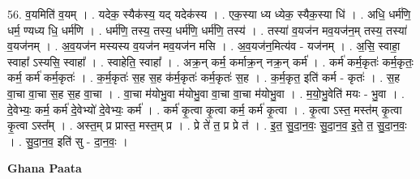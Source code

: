 \documentclass[17pt]{extarticle}
\begin{document}
56. व॒यमिति॑ व॒यम् । . यदेक॒ स्यैक॑स्य॒ यद् यदेक॑स्य । . एक॒स्या ध्य ध्येक॒ स्यैक॒स्या धि॑ । . अधि॒ धर्म॑णि॒ धर्म॒ ण्यध्य धि॒ धर्म॑णि । . धर्म॑णि॒ तस्य॒ तस्य॒ धर्म॑णि॒ धर्म॑णि॒ तस्य॑ । . तस्या॑ व॒यज॑न मव॒यज॑न॒म् तस्य॒ तस्या॑ व॒यज॑नम् । . अ॒व॒यज॑न मस्यस्य व॒यज॑न मव॒यज॑न मसि । . अ॒व॒यज॑न॒मित्य॑व - यज॑नम् । . अ॒सि॒ स्वाहा॒ स्वाहा᳚ ऽस्यसि॒ स्वाहा᳚ । . स्वाहेति॒ स्वाहा᳚ । . अक्र॒न् कर्म॒ कर्माक्र॒न् नक्र॒न् कर्म॑ । . कर्म॑ कर्म॒कृतः॑ कर्म॒कृतः॒ कर्म॒ कर्म॑ कर्म॒कृतः॑ । . क॒र्म॒कृतः॑ स॒ह स॒ह क॑र्म॒कृतः॑ कर्म॒कृतः॑ स॒ह । . क॒र्म॒कृत॒ इति॑ कर्म - कृतः॑ । . स॒ह वा॒चा वा॒चा स॒ह स॒ह वा॒चा । . वा॒चा म॑योभु॒वा म॑योभु॒वा वा॒चा वा॒चा म॑योभु॒वा । . म॒यो॒भु॒वेति॑ मयः - भु॒वा । . दे॒वेभ्यः॒ कर्म॒ कर्म॑ दे॒वेभ्यो॑ दे॒वेभ्यः॒ कर्म॑ । . कर्म॑ कृ॒त्वा कृ॒त्वा कर्म॒ कर्म॑ कृ॒त्वा । . कृ॒त्वा ऽस्त॒ मस्त॑म् कृ॒त्वा कृ॒त्वा ऽस्त᳚म् । . अस्त॒म् प्र प्रास्त॒ मस्त॒म् प्र । . प्रे ते॑ त॒ प्र प्रे त॑ । . इ॒त॒ सु॒दा॒न॒वः॒ सु॒दा॒न॒व॒ इ॒ते॒ त॒ सु॒दा॒न॒वः॒ । . सु॒दा॒न॒व॒ इति॑ सु - दा॒न॒वः॒ । \newline

\textbf{Ghana Paata } \newline
\end{document}
